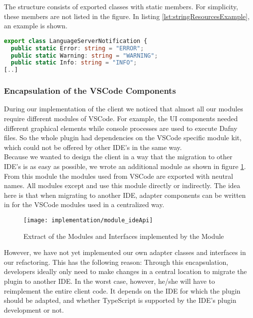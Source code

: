 The structure consists of exported classes with static members. For simplicity, these members are not listed in the figure.
In listing \ref{lst:stringResourcesExample}, an example is shown.

\begin{lstlisting}[language=typescript, caption={Excerpt from \code{LanguageServerNotification}}, captionpos=b, label={lst:stringResourcesExample}]
export class LanguageServerNotification {
  public static Error: string = "ERROR";
  public static Warning: string = "WARNING";
  public static Info: string = "INFO";
[..]
\end{lstlisting}

\subsubsection{Encapsulation of the VSCode Components}
During our implementation of the client we noticed that almost all our modules require different modules of VSCode.
For example, the UI components needed different graphical elements while console processes are used to execute Dafny files.
So the whole plugin had dependencies on the VSCode specific module kit,
which could not be offered by other IDE's in the same way. \\

Because we wanted to design the client in a way that the migration to other IDE's is as easy as possible,
we wrote an additional module  as shown in figure \ref{fig:packageIdeApi}.
From this module the modules used from VSCode are exported with neutral names.
All modules except  and  use this module directly or indirectly.
The idea here is that when migrating to another IDE, adapter components can be written in 
for the VSCode modules used in a centralized way.

\begin{figure}[H]
    \centering
    \texttt{[image: implementation/module\_ideApi]}
    \caption{Extract of the Modules and Interfaces implemented by the Module }
    \label{fig:packageIdeApi}
\end{figure}

However, we have not yet implemented our own adapter classes and interfaces in our refactoring.
This has the following reason:
Through this encapsulation, developers ideally only need to make changes in a central location to migrate the plugin to another IDE.
In the worst case, however, he/she will have to reimplement the entire client code.
It depends on the IDE for which the plugin should be adapted,
and whether TypeScript is supported by the IDE's plugin development or not.\\

